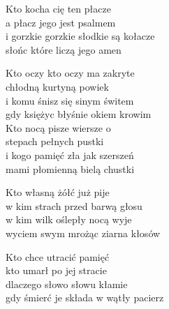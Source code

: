 \begin{text}
    Kto kocha cię ten płacze\\
    a płacz jego jest psalmem\\
    i gorzkie gorzkie słodkie są kołacze\\
    słońc które liczą jego amen

    Kto oczy kto oczy ma zakryte\\
    chłodną kurtyną powiek\\
    i komu śnisz się sinym świtem\\
    gdy księżyc błyśnie okiem krowim\\
    Kto nocą pisze wiersze o\\
    stepach pełnych pustki\\
    i kogo pamięć zła jak szerszeń\\
    mami płomienną bielą chustki

    Kto własną żółć już pije\\
    w kim strach przed barwą głosu\\
    w kim wilk oślepły nocą wyje\\
    wyciem swym mrożąc ziarna kłosów

    Kto chce utracić pamięć\\
    kto umarł po jej stracie\\
    dlaczego słowo słowu kłamie\\
    gdy śmierć je składa w wątły pacierz
\end{text}
\begin{chord}

\end{chord}